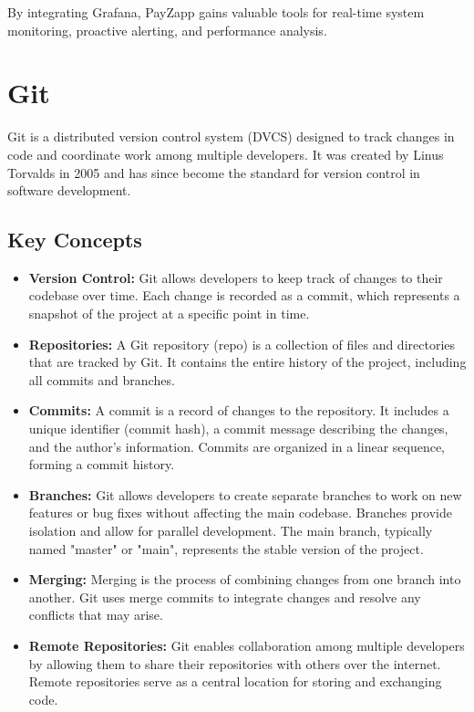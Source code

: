 \documentclass[12pt,a4paper]{report}
\begin{document}
By integrating Grafana, PayZapp gains valuable tools for real-time system monitoring, proactive alerting, and performance analysis.

\section{Git}

Git is a distributed version control system (DVCS) designed to track changes in code and coordinate work among multiple developers. It was created by Linus Torvalds in 2005 and has since become the standard for version control in software development.

\subsection{Key Concepts}

\begin{itemize}
    \item \textbf{Version Control:} Git allows developers to keep track of changes to their codebase over time. Each change is recorded as a commit, which represents a snapshot of the project at a specific point in time.
    
    \item \textbf{Repositories:} A Git repository (repo) is a collection of files and directories that are tracked by Git. It contains the entire history of the project, including all commits and branches.
    
    \item \textbf{Commits:} A commit is a record of changes to the repository. It includes a unique identifier (commit hash), a commit message describing the changes, and the author's information. Commits are organized in a linear sequence, forming a commit history.
    
    \item \textbf{Branches:} Git allows developers to create separate branches to work on new features or bug fixes without affecting the main codebase. Branches provide isolation and allow for parallel development. The main branch, typically named "master" or "main", represents the stable version of the project.
    
    \item \textbf{Merging:} Merging is the process of combining changes from one branch into another. Git uses merge commits to integrate changes and resolve any conflicts that may arise.
    
    \item \textbf{Remote Repositories:} Git enables collaboration among multiple developers by allowing them to share their repositories with others over the internet. Remote repositories serve as a central location for storing and exchanging code.
\end{itemize}
\end{document}
